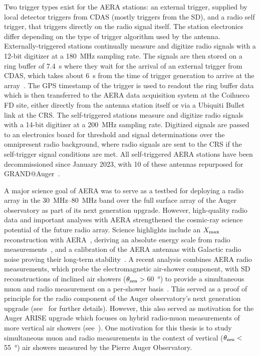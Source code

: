 Two trigger types exist for the AERA stations: an external trigger, supplied by local detector triggers from CDAS (mostly triggers from the SD), and a radio self trigger, that triggers directly on the radio signal itself.
The station electronics differ depending on the type of trigger algorithm used by the antenna.
Externally-triggered stations continually measure and digitize radio signals with a 12-bit digitizer at a \qty{180}{\mega\hertz} sampling rate.
The signals are then stored on a ring buffer of \qty{7.4}{\second} where they wait for the arrival of an external trigger from CDAS, which takes about \qty{6}{\second} from the time of trigger generation to arrive at the array~\cite{sato_privcomm_2025}.
The GPS timestamp of the trigger is used to readout the ring buffer data which is then transferred to the AERA data acquisition system at the Coihueco FD site, either directly from the antenna station itself or via a Ubiquiti Bullet link at the CRS.
The self-triggered stations measure and digitize radio signals with a 14-bit digitizer at a \qty{200}{\mega\hertz} sampling rate.
Digitized signals are passed to an electronics board for threshold and signal determinations over the omnipresent radio background, where radio signals are sent to the CRS if the self-trigger signal conditions are met.
All self-triggered AERA stations have been decommissioned since January 2023, with 10 of these antennas repurposed for GRAND@Auger~\cite{deerrico_icrc2025_grandatauger}.

A major science goal of AERA was to serve as a testbed for deploying a radio array in the \qtyrange{30}{80}{\mega\hertz} band over the full surface array of the Auger observatory as part of its next generation upgrade.
However, high-quality radio data and important analyses with AERA strengthened the cosmic-ray science potential of the future radio array.
Science highlights include an $X_{\rm max}$ reconstruction with AERA~\cite{auger_prd2024_aeraxmax, auger_prl2024_aeraxmax}, deriving an absolute energy scale from radio measurements~\cite{auger_icrc2025_aeraenergyscale}, and a calibration of the AERA antennas with Galactic radio noise proving their long-term stability~\cite{auger_jinst2025_aeracalibration}.
A recent analysis combines AERA radio measurements, which probe the electromagnetic air-shower component, with SD reconstructions of inclined air showers ($\theta_{\rm zen}>\,$\qty{60}{\degree}) to provide a simultaneous muon and radio measurement on a per-shower basis~\cite{auger_prd2025_aeramuoninclined}.
This served as a proof of principle for the radio component of the Auger observatory's next generation upgrade (see~ for further details).
However, this also served as motivation for the Auger ARISE upgrade which focuses on hybrid radio-muon measurements of more vertical air showers (see~).
One motivation for this thesis is to study simultaneous muon and radio measurements in the context of vertical ($\theta_{\rm zen}<\,$\qty{55}{\degree}) air showers measured by the Pierre Auger Observatory.

